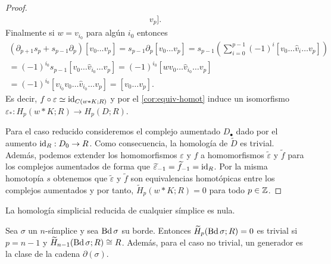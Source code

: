 \begin{proof}
\begin{gather*}
		v_{p}].
	\end{gather*}
	Finalmente si \(w = v_{i_0}\) para algún \(i_{0}\) entonces
	\begin{gather*}
		(\partial_{p+1}s_{p}+s_{p-1}\partial_{p})[v_{0}\ldots v_{p}]=s_{p-1}\partial_{p}
		[v_{0}\ldots v_{p}] =s_{p-1}\left( \sum_{i=0}^{p-1}(-1)^{i}[v_{0}\ldots \hat{v}
		_{i}\ldots v_{p}] \right) \\ =(-1)^{i_0}s_{p-1}[v_{0}\ldots \hat{v}_{i_0}\ldots
		v_{p}] =(-1)^{i_0}[wv_{0}\ldots \hat{v}_{i_0}\ldots v_{p}] \\ =(-1)^{i_0}[v_{i_0}
		v_{0}\ldots \hat{v}_{i_0}\ldots v_{p}] =[v_{0}\ldots v_{p}].
	\end{gather*}
	Es decir, \(f \circ \varepsilon \simeq \operatorname{id}_{C(w \ast K;R)}\) y por el
	\autoref{cor:equiv-homot} induce un isomorfismo
	\(\varepsilon_{*}: H_{p}(w \ast K;R) \to H_{p}(D;R)\).
	
	Para el caso reducido consideremos el complejo aumentado \(D_{\bullet}\) dado
	por el aumento \(\operatorname{id}_{R}: D_{0}\to R\). Como consecuencia, la homología de
	\(\widetilde{D}\) es trivial. Además, podemos extender los homomorfismos
	\(\varepsilon\) y \(f\) a homomorfismos \(\widetilde{\varepsilon}\) y
	\(\widetilde{f}\) para los complejos aumentados de forma que
	\(\widetilde{\varepsilon}_{-1}= \widetilde{f}_{-1}= \operatorname{id}_{R}\). Por la misma homotopía
	\(s\) obtenemos que \(\widetilde{\varepsilon}\) y \(\widetilde{f}\) son equivalencias
	homotópicas entre los complejos aumentados y por tanto,
	\(\widetilde{H}_{p}(w \ast K;R) = 0\) para todo \(p \in \mathbb{Z}\).
\end{proof}
\begin{corolario}
	\label{cor:cono-nulo} La homología simplicial reducida de cualquier símplice es
	nula.
\end{corolario}
\begin{corolario}
	Sea \(\sigma\) un \(n\)-símplice y sea \(\operatorname{Bd} \sigma\) su borde. Entonces
	\(\widetilde{H}_{p}(\operatorname{Bd} \sigma;R) = 0\) es trivial si \(p = n-1\) y
	\(\widetilde{H}_{n-1}(\operatorname{Bd} \sigma; R) \cong R\). Además, para el caso no trivial,
	un generador es la clase de la cadena \(\partial(\sigma)\).
\end{corolario}

